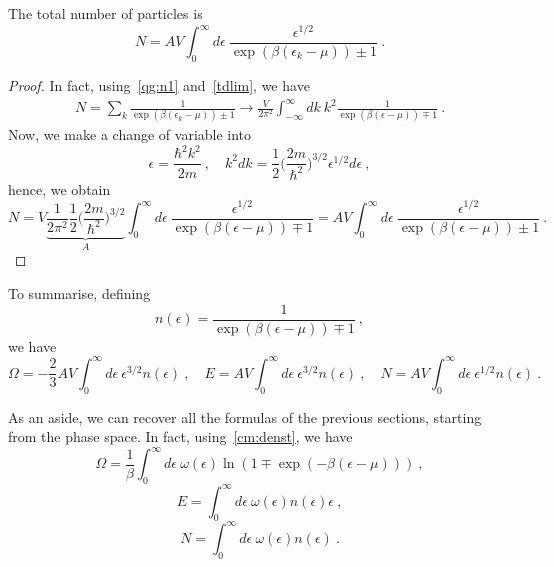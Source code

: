     The total number of particles is 
    \begin{equation}\label{qg:n2}
        N = A V \int_0^\infty d\epsilon ~ \frac{\epsilon^{1/2}}{\exp(\beta(\epsilon_k - \mu)) \pm 1}  ~.
    \end{equation}
    \begin{proof}
        In fact, using~\eqref{qg:n1} and~\eqref{tdlim}, we have 
        \begin{equation*}
        \begin{aligned}
            N = \sum_k \frac{1}{\exp(\beta(\epsilon_k - \mu)) \pm 1} \rightarrow \frac{V}{2\pi^2} \int_{-\infty}^\infty dk~ k^2 \frac{1}{\exp(\beta(\epsilon - \mu)) \mp 1} ~.
        \end{aligned}
        \end{equation*}
        Now, we make a change of variable into
        \begin{equation*}
            \epsilon = \frac{\hbar^2 k^2}{2m} ~, \quad k^2 dk = \frac{1}{2} \Big (\frac{2m}{\hbar^2}\Big)^{3/2} \epsilon^{1/2} d\epsilon ~,
        \end{equation*}
        hence, we obtain
        \begin{equation*}
            N = V \underbrace{ \frac{1}{2\pi^2} \frac{1}{2} \Big (\frac{2m}{\hbar^2}\Big)^{3/2}}_A \int_0^\infty d\epsilon ~ \frac{\epsilon^{1/2}}{\exp(\beta(\epsilon - \mu)) \mp 1} = A V \int_0^\infty d\epsilon ~ \frac{\epsilon^{1/2}}{\exp(\beta(\epsilon - \mu)) \pm 1} ~.
        \end{equation*}
    \end{proof}

    To summarise, defining 
    \begin{equation*}
        n (\epsilon) = \frac{1}{\exp(\beta(\epsilon - \mu)) \mp 1} ~,
    \end{equation*}
    we have 
    \begin{equation*}
        \Omega = - \frac{2}{3} A V \int_0^\infty d\epsilon ~ \epsilon^{3/2} n(\epsilon) ~, \quad E = A V \int_0^\infty d\epsilon ~ \epsilon^{3/2} n(\epsilon) ~, \quad N = A V \int_0^\infty d\epsilon ~ \epsilon^{1/2} n(\epsilon) ~.
    \end{equation*}

    As an aside, we can recover all the formulas of the previous sections, starting from the phase space. In fact, using~\eqref{cm:denst}, we have 
    \begin{equation}\label{q:o}
        \Omega = \frac{1}{\beta} \int_0^\infty d\epsilon ~ \omega(\epsilon) \ln (1 \mp \exp(- \beta (\epsilon - \mu))) ~,
    \end{equation}
    \begin{equation}\label{q:e}
        E = \int_0^\infty d\epsilon ~ \omega(\epsilon) n(\epsilon) \epsilon ~,
    \end{equation}
    \begin{equation}\label{q:n}
        N = \int_0^\infty d\epsilon ~ \omega(\epsilon) n(\epsilon) ~.
    \end{equation}

